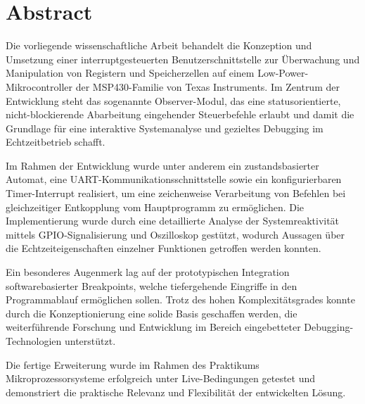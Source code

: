 
\chapter*{Abstract}
\label{cha:Abstract}

\thispagestyle{empty}


Die vorliegende wissenschaftliche Arbeit behandelt die Konzeption und Umsetzung einer interruptgesteuerten Benutzerschnittstelle zur \"Uberwachung und Manipulation von Registern und Speicherzellen auf einem Low-Power-Mikrocontroller der MSP430-Familie von Texas Instruments. Im Zentrum der Entwicklung steht das sogenannte Observer-Modul, das eine statusorientierte, nicht-blockierende Abarbeitung eingehender Steuerbefehle erlaubt und damit die Grundlage f\"ur eine interaktive Systemanalyse und gezieltes Debugging im Echtzeitbetrieb schafft.

Im Rahmen der Entwicklung wurde unter anderem ein zustandsbasierter Automat, eine UART-Kommunikationsschnittstelle sowie ein konfigurierbaren Timer-Interrupt realisiert, um eine zeichenweise Verarbeitung von Befehlen bei gleichzeitiger Entkopplung vom Hauptprogramm zu erm\"oglichen. Die Implementierung wurde durch eine detaillierte Analyse der Systemreaktivit\"at mittels GPIO-Signalisierung und Oszilloskop gest\"utzt, wodurch Aussagen \"uber die Echtzeiteigenschaften einzelner Funktionen getroffen werden konnten.

Ein besonderes Augenmerk lag auf der prototypischen Integration softwarebasierter Breakpoints, welche tiefergehende Eingriffe in den Programmablauf erm\"oglichen sollen. Trotz des hohen Komplexit\"atsgrades konnte durch die Konzeptionierung eine solide Basis geschaffen werden, die weiterf\"uhrende Forschung und Entwicklung im Bereich eingebetteter Debugging-Technologien unterst\"utzt.

Die fertige Erweiterung wurde im Rahmen des Praktikums Mikroprozessorsysteme erfolgreich unter Live-Bedingungen getestet und demonstriert die praktische Relevanz und Flexibilit\"at der entwickelten L\"osung.